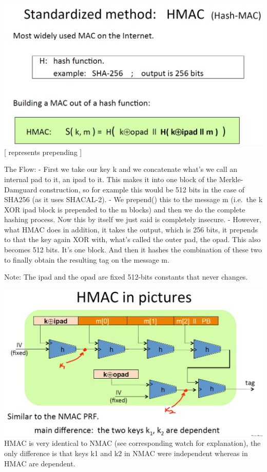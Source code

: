 \documentclass[11pt]{article}
\makeatletter
\def\maxwidth{\ifdim\Gin@nat@width>\linewidth\linewidth
    \else\Gin@nat@width\fi}
\let\Oldincludegraphics\includegraphics
\renewcommand{\includegraphics}[1]{\Oldincludegraphics[width=.8\maxwidth]{#1}}
\makeatother
\begin{document}
\includegraphics{./Images/StandardMethod-HMAC.png} {[}
\textbar{}\textbar{} represents prepending {]}

The Flow: - First we take our key k and we concatenate what's we call an
internal pad to it, an ipad to it. This makes it into one block of the
Merkle-Damguard construction, so for example this would be 512 bits in
the case of SHA256 (as it uses SHACAL-2). - We
prepend(\textbar{}\textbar{}) this to the message m (i.e.~the k XOR ipad
block is prepended to the m blocks) and then we do the complete hashing
process. Now this by itself we just said is completely insecure. -
However, what HMAC does in addition, it takes the output, which is 256
bits, it prepends to that the key again XOR with, what's called the
outer pad, the opad. This also becomes 512 bits. It's one block. And
then it hashes the combination of these two to finally obtain the
resulting tag on the message m.

Note: The ipad and the opad are fixed 512-bits constants that never
changes.

\includegraphics{./Images/HMACinPicture.png} HMAC is very identical to
NMAC (see corresponding watch for explanation), the only difference is
that keys k1 and k2 in NMAC were independent whereas in HMAC are
dependent.
\end{document}

